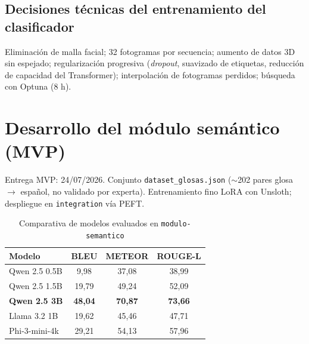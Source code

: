 \documentclass[12pt,a4paper]{report}
\begin{document}
\section{Decisiones técnicas del entrenamiento del clasificador}
Eliminación de malla facial; 32 fotogramas por secuencia; aumento de datos 3D sin espejado; regularización progresiva (\textit{dropout}, suavizado de etiquetas, reducción de capacidad del Transformer); interpolación de fotogramas perdidos; búsqueda con Optuna (8 h).

\chapter{Desarrollo del módulo semántico (MVP)}
\label{anexo:semantico}

Entrega MVP: 24/07/2026. Conjunto \texttt{dataset\_glosas.json} ($\sim$202 pares glosa $\rightarrow$ español, no validado por experta). Entrenamiento fino LoRA con Unsloth; despliegue en \texttt{integration} vía PEFT.

\begin{table}[H]
\centering
\caption{Comparativa de modelos evaluados en \texttt{modulo-semantico}}
\label{tab:llm}
\small
\begin{tabular}{@{}lccc@{}}
\toprule
\textbf{Modelo} & \textbf{BLEU} & \textbf{METEOR} & \textbf{ROUGE-L} \\
\midrule
Qwen 2.5 0.5B & 9,98 & 37,08 & 38,99 \\
Qwen 2.5 1.5B & 19,79 & 49,24 & 52,09 \\
\textbf{Qwen 2.5 3B} & \textbf{48,04} & \textbf{70,87} & \textbf{73,66} \\
Llama 3.2 1B & 19,62 & 45,46 & 47,71 \\
Phi-3-mini-4k & 29,21 & 54,13 & 57,96 \\
\bottomrule
\end{tabular}
\end{table}
\end{document}
